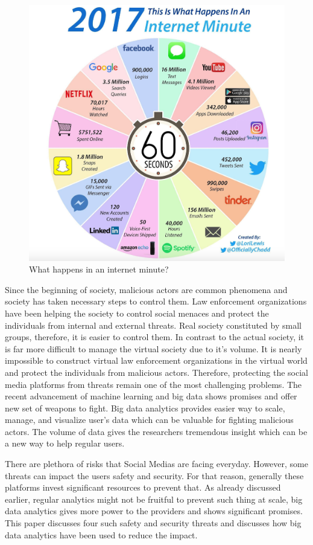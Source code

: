 \documentclass[sigconf]{acmart}
\begin{document}
\begin{figure}[!ht]
 \centering\includegraphics[width=0.5\columnwidth]{images/one-internet-minute.png}
  \caption{What happens in an internet minute?~\cite{social-media2}}\label{f:socialmedia}
\end{figure}

Since the beginning of society, malicious actors are common phenomena and society has taken necessary steps to control them. Law enforcement organizations have been helping the society to control social menaces and protect the individuals from internal and external threats.  Real society constituted by small groups, therefore, it is easier to control  them. In contrast to the actual society, it is far more difficult to manage the virtual society due to it's volume. It is nearly impossible to construct virtual law enforcement organizations in the virtual world and protect the individuals from malicious actors. Therefore, protecting the social media platforms from threats remain one of the most challenging problems. The recent advancement of machine learning and big data shows promises and offer new set of weapons to fight. Big data analytics provides easier way to scale, manage, and visualize user's data which can be valuable for fighting malicious actors. The volume of data gives the researchers tremendous insight which can be a new way to help regular users. 

There are plethora of risks that Social Medias are facing everyday. However, some threats can impact the users safety and security. For that reason, generally these platforms invest significant resources to prevent that. As already discussed earlier, regular analytics might not be fruitful to prevent such thing at scale, big data analytics gives more power to the providers and shows significant promises. This paper discusses four such safety and security threats and discusses how big data analytics have been used to reduce the impact. 
\end{document}

